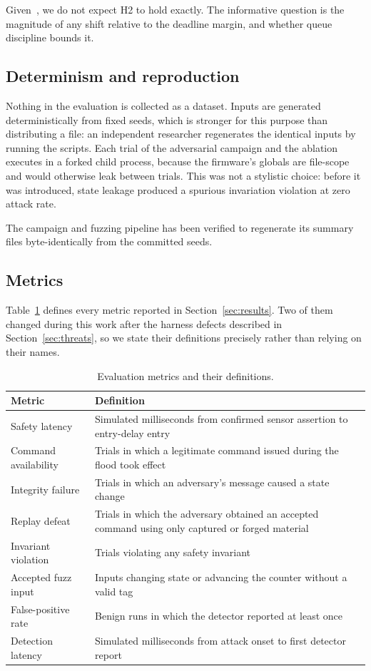 Given~\cite{behnke2020}, we do not expect H2 to hold exactly. The informative question is the
magnitude of any shift relative to the deadline margin, and whether queue discipline bounds it.

\subsection{Determinism and reproduction}

Nothing in the evaluation is collected as a dataset. Inputs are generated deterministically from
fixed seeds, which is stronger for this purpose than distributing a file: an independent
researcher regenerates the identical inputs by running the scripts. Each trial of the adversarial
campaign and the ablation executes in a forked child process, because the firmware's globals are
file-scope and would otherwise leak between trials. This was not a stylistic choice: before it
was introduced, state leakage produced a spurious invariation violation at zero attack rate.

The campaign and fuzzing pipeline has been verified to regenerate its summary files
byte-identically from the committed seeds.

\subsection{Metrics}

Table~\ref{tab:metrics} defines every metric reported in Section~\ref{sec:results}. Two of them
changed during this work after the harness defects described in Section~\ref{sec:threats}, so
we state their definitions precisely rather than relying on their names.

\begin{table}[htbp]
\centering\small
\caption{Evaluation metrics and their definitions.}
\label{tab:metrics}
\begin{tabular}{@{}lp{}@{}}
\toprule
Metric & Definition \\
\midrule
Safety latency & Simulated milliseconds from confirmed sensor assertion to entry-delay entry \\
Command availability & Trials in which a legitimate command issued during the flood took effect \\
Integrity failure & Trials in which an adversary's message caused a state change \\
Replay defeat & Trials in which the adversary obtained an accepted command using only captured or forged material \\
Invariant violation & Trials violating any safety invariant \\
Accepted fuzz input & Inputs changing state or advancing the counter without a valid tag \\
False-positive rate & Benign runs in which the detector reported at least once \\
Detection latency & Simulated milliseconds from attack onset to first detector report \\
\bottomrule
\end{tabular}
\end{table}

